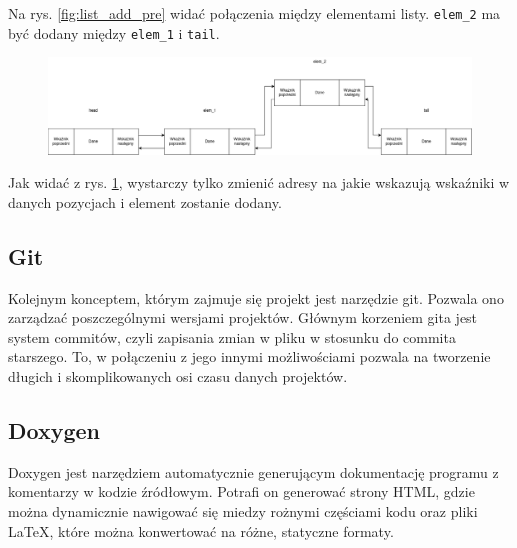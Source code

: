Na rys. \ref{fig:list_add_pre} widać połączenia między elementami listy. \texttt{elem\_2} ma być dodany między \texttt{elem\_1} i \texttt{tail}. 

\begin{figure}[H]
	\centering
	\includegraphics[width=1\textwidth]{images/listadodanie_post.drawio.png}
	\caption{}
	\label{fig:list_add_post}
\end{figure}

Jak widać z rys. \ref{fig:list_add_post}, wystarczy tylko zmienić adresy na jakie wskazują wskaźniki w danych pozycjach i element zostanie dodany.
\subsection{Git}
Kolejnym konceptem, którym zajmuje się projekt jest narzędzie git. Pozwala ono zarządzać poszczególnymi wersjami projektów. Głównym korzeniem gita jest system commitów, czyli zapisania zmian w pliku w stosunku do commita starszego. To, w połączeniu z jego innymi możliwościami pozwala na tworzenie długich i skomplikowanych osi czasu danych projektów. 

\subsection{Doxygen}
Doxygen jest narzędziem automatycznie generującym dokumentację programu z komentarzy w kodzie źródłowym. Potrafi on generować strony HTML, gdzie można dynamicznie nawigować się miedzy rożnymi częściami kodu oraz pliki \LaTeX, które można konwertować na różne, statyczne formaty.
